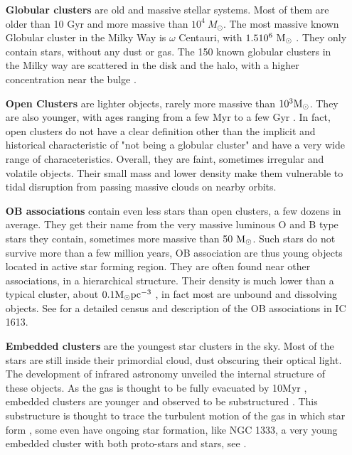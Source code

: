 \begin{itemize}


\item[\textbf{Globular clusters}] are old and massive stellar systems. Most of them are older than 10 Gyr and more massive than $10^4~M_\odot$. The most massive known Globular cluster in the Milky Way is $\omega$ Centauri, with $1.5 10^6~{\textrm{M}_\odot}$ \citep{Marks2010}. They only contain stars, without any dust or gas. The 150 known globular clusters in the Milky way are scattered in the disk and the halo, with a higher concentration near the bulge \citep{Harris1996}. 

\item[\textbf{Open Clusters}] are lighter objects, rarely more massive than $10^3 {\textrm{M}_\odot}$. They are also younger, with ages ranging from a few Myr to a few Gyr \citep{Dias2002}. In fact, open clusters do not have a clear definition other than the implicit and historical characteristic of "not being a globular cluster" and have a very wide range of characeteristics. Overall, they are faint, sometimes irregular and volatile objects. Their small mass and lower density make them vulnerable to tidal disruption from passing massive clouds on nearby orbits.

\item[\textbf{OB associations}] contain even less stars than open clusters, a few dozens in average. They get their name from the very massive luminous O and B type stars they contain, sometimes more massive than 50 ${\textrm{M}_\odot}$. Such stars do not survive more than a few million years, OB association are thus young objects located in active star forming region. They are often found near other associations, in a hierarchical structure.  Their density is much lower than a typical cluster, about $0.1 {\textrm{M}_\odot} \textrm{pc}^{-3}$ \citep{Wright2014},  in fact most are unbound and dissolving objects. See \cite{Garcia2010} for a detailed census and description of the OB associations in IC 1613.

\item[\textbf{Embedded clusters}] are the youngest star clusters in the sky. Most of the stars are still inside their primordial cloud, dust obscuring their optical light. The development of infrared astronomy unveiled the internal structure of these objects. As the gas is thought to be fully evacuated by 10Myr \citep{Lada2003}, embedded clusters are younger and observed to be substructured \citep{Kuhn2015}. This substructure is thought to trace the turbulent motion of the gas in which star form \citep{MacLow2004,Schmeja2008}, some even have ongoing star formation, like NGC 1333, a very young embedded cluster with both proto-stars and stars, see \cite{Foster2015}.


\end{itemize}
